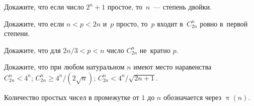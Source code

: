 


\begingroup
    \ifdefined\mathup
        \def\pifunc{\mathup{\pi}}%
    \else
        \def\pifunc{\uppi}%
    \fi

\begin{problems}

\item
Докажите, что если число $2^n + 1$ простое, то~$n$~--- степень двойки.

\item
Докажите, что если $n < p < 2 n$ и~$p$ просто, то~$p$ входит в~$C_{2n}^n$
ровно в~первой степени.

\item
Докажите, что для $2 n / 3 < p < n$ число $C_{2n}^n$ не~кратно $p$.

\item
Докажите, что при любом натуральном $n$ имеют место наравенства
\\
\subproblem $C_{2n}^{n} < 4^{n}$;
\qquad
\subproblem $C_{2n}^{n} \geq 4^{n} / (2 \sqrt{n})$;
\qquad
\subproblem $C_{2n}^{n} < 4^{n} / \sqrt{2 n + 1}$.

\end{problems}

Количество простых чисел в промежутке от $1$ до $n$ обозначается через
$\pifunc(n)$.

